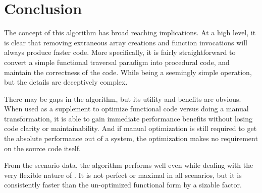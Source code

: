 \chapter{Conclusion}

The concept of this algorithm has broad reaching implications.  At a high level, it is clear that removing extraneous array creations and function invocations will always produce faster code.  More specifically, it is fairly straightforward to convert a simple functional traversal paradigm into procedural code, and maintain the correctness of the code. While being a seemingly simple operation, but the details are deceptively complex.

There may be gaps in the algorithm, but its utility and benefits are obvious.  When used as a supplement to optimize functional code versus doing a manual transformation, it is able to gain immediate performance benefits without losing code clarity or maintainability.  And if manual optimization is still required to get the absolute performance out of a system, the optimization makes no requirement on the source code itself.    

From the scenario data, the algorithm performs well even while dealing with the very flexible nature of \javascript. It is not perfect or maximal in all scenarios, but it is consistently faster than the un-optimized functional form by a sizable factor.